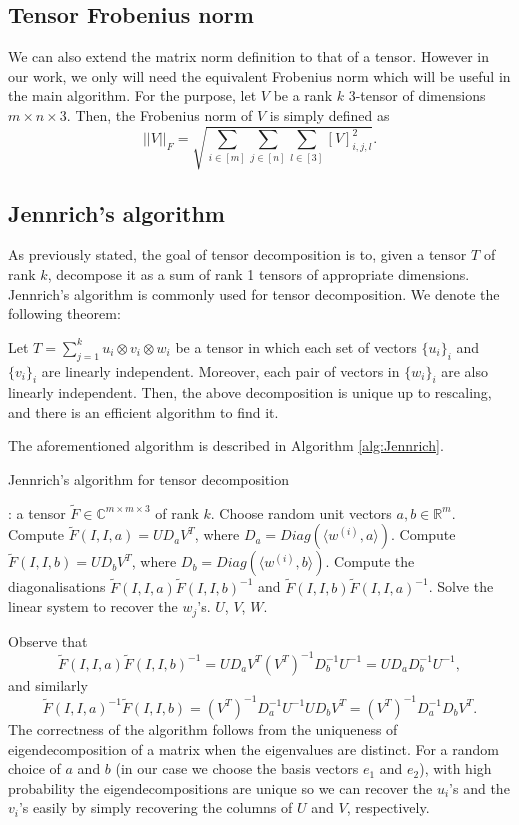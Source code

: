 \subsection{Tensor Frobenius norm}
We can also extend the matrix norm definition to that of a tensor. However in our work, we only will need the equivalent Frobenius norm which will be useful in the main algorithm. For the purpose, let $V$ be a rank $k$ 3-tensor of dimensions $m\times n\times 3$. Then, the Frobenius norm of $V$ is simply defined as 
\begin{equation}
    ||V||_F=\sqrt{\sum_{i\in[m]}\sum_{j\in[n]}\sum_{l\in[3]}[V]_{i,j,l}^2}.
\end{equation}
\subsection{Jennrich's algorithm}
As previously stated, the goal of tensor decomposition is to, given a tensor $T$ of rank $k$, decompose it as a sum of rank 1 tensors of appropriate dimensions. Jennrich's algorithm is commonly used for tensor decomposition. We denote the following theorem:
\begin{theorem}
    Let $T=\sum_{j=1}^k u_i\otimes v_i\otimes w_i$ be a tensor in which each set of vectors $\{u_i\}_i$ and $\{v_i\}_i$ are linearly independent. Moreover, each pair of vectors in $\{w_i\}_i$ are also linearly independent. Then, the above decomposition is unique up to rescaling, and there is an efficient algorithm to find it.
\end{theorem}
The aforementioned algorithm is described in Algorithm \ref{alg:Jennrich}.
\begin{algorithm}
    \caption{Jennrich's algorithm for tensor decomposition}
    \label{alg:Jennrich}
    \begin{algorithmic}
        : a tensor $\widetilde{F}\in\mathbb{C}^{m\times m\times 3}$ of rank $k$.
        \State Choose random unit vectors $a,b\in\mathbb{R}^m$.
        \State Compute $\widetilde{F}(I,I,a)=UD_aV^T$, where $D_a=Diag(\langle w^{(i)},a\rangle)$.
        \State Compute $\widetilde{F}(I,I,b)=UD_bV^T$, where $D_b=Diag(\langle w^{(i)},b\rangle)$.
        \State Compute the diagonalisations $\widetilde{F}(I,I,a)\widetilde{F}(I,I,b)^{-1}$ and $\widetilde{F}(I,I,b)\widetilde{F}(I,I,a)^{-1}$.
        \State Solve the linear system to recover the $w_j$'s.
         $U$, $V$, $W$.
    \end{algorithmic}
\end{algorithm}\par
Observe that $$\widetilde{F}(I,I,a)\widetilde{F}(I,I,b)^{-1}=UD_aV^T(V^T)^{-1}D_b^{-1}U^{-1}=UD_aD_b^{-1}U^{-1},$$ and similarly $$\widetilde{F}(I,I,a)^{-1}\widetilde{F}(I,I,b)=(V^T)^{-1}D_a^{-1}U^{-1}UD_bV^T=(V^T)^{-1}D_a^{-1}D_bV^T.$$ The correctness of the algorithm follows from the uniqueness of eigendecomposition of a matrix when the eigenvalues are distinct. For a random choice of $a$ and $b$ (in our case we choose the basis vectors $e_1$ and $e_2$), with high probability the eigendecompositions are unique so we can recover the $u_i$'s and the $v_i$'s easily by simply recovering the columns of $U$ and $V$, respectively.